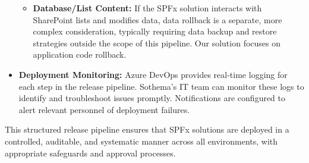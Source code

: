 \begin{itemize}
\begin{itemize}
\begin{enumerate}
        \end{enumerate}
        \item \textbf{Database/List Content:} If the SPFx solution interacts with SharePoint lists and modifies data, data rollback is a separate, more complex consideration, typically requiring data backup and restore strategies outside the scope of this pipeline. Our solution focuses on application code rollback.
    \end{itemize}
    \item \textbf{Deployment Monitoring:} Azure DevOps provides real-time logging for each step in the release pipeline. Sothema's IT team can monitor these logs to identify and troubleshoot issues promptly. Notifications are configured to alert relevant personnel of deployment failures.
\end{itemize}

This structured release pipeline ensures that SPFx solutions are deployed in a controlled, auditable, and systematic manner across all environments, with appropriate safeguards and approval processes.

